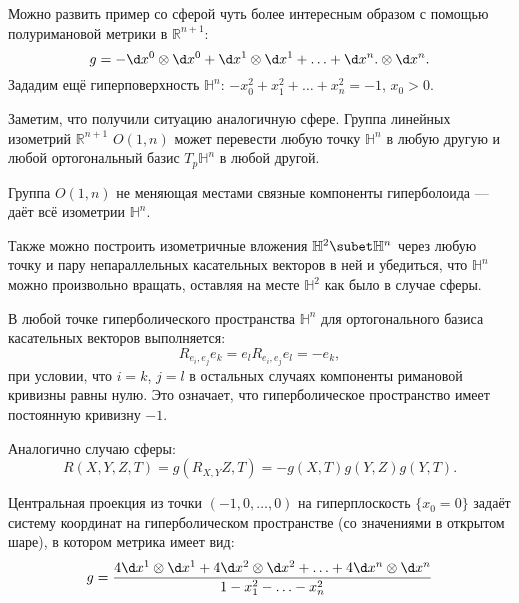 Можно развить пример со сферой чуть более интересным образом с помощью полуримановой метрики в $\mathbb{R}^{n+1}$:
\begin{equation*}
	g = - \d x^0 \otimes \d x^0 + \d x^1 \otimes \d x^1 + \ldots + \d x^n. \otimes \d x^n.
\end{equation*}
Зададим ещё гиперповерхность $\mathbb{H}^n$: $-x_0^2 + x^2_1 + \ldots + x_n^2 = -1 $, $x_0 >0$.

Заметим, что получили ситуацию аналогичную сфере. Группа линейных изометрий $\mathbb{R}^{n+1}$ $O(1,n)$ может перевести любую точку $\mathbb{H}^n $ в любую другую и любой ортогональный базис $T_p \mathbb{H}^n$ в любой другой.

\begin{to_tas}
	Группа $O(1,n)$ не меняющая местами связные компоненты гиперболоида --- даёт всё изометрии $\mathbb{H}^n$.
\end{to_tas}

Также можно построить изометричные вложения $\mathbb{H}^2 \subet \mathbb{H}^n$ через любую точку и пару непараллельных касательных векторов в ней и убедиться, что $\mathbb{H}^n$ можно произвольно вращать, оставляя на месте $\mathbb{H}^2$ как было в случае сферы.

\begin{to_thr}
	В любой точке гиперболического пространства $\mathbb{H}^n$ для ортогонального базиса касательных векторов выполняется:
	\begin{equation*}
		R_{e_i,e_j}e_k = e_l R_{e_i, e_j} e_l = -e_k,
	\end{equation*}
	при условии, что $i = k$, $j = l$ в остальных случаях компоненты римановой кривизны равны нулю. Это означает, что гиперболическое пространство имеет постоянную кривизну $-1$.
\end{to_thr}

Аналогично случаю сферы:
\begin{equation*}
	R(X,Y,Z,T) = g(R_{X,Y}Z,T) = - g (X,T) g(Y,Z) g (Y,T).
\end{equation*}

\begin{to_task}
	Центральная проекция из точки $(-1,0,\ldots,0)$ на гиперплоскость $\{x_0=0\}$ задаёт систему координат на гиперболическом пространстве (со значениями в открытом шаре), в котором метрика имеет вид:
	\begin{equation*}
		g = \frac{4 \d x^1 \otimes \d x^1 + 4 \d x^2 \otimes \d x^2 + \ldots+ 4 \d x^n \otimes \d x^n}{1 - x_1^2 - \ldots - x_n^2}
	\end{equation*}
\end{to_task}
